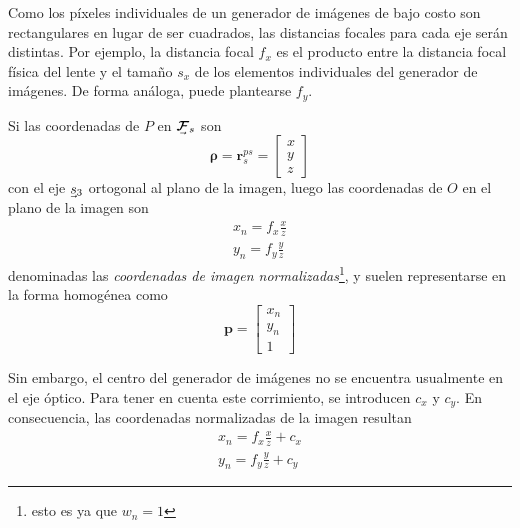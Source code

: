 Como los píxeles individuales de un generador de imágenes de bajo costo son rectangulares en lugar de ser cuadrados, las distancias focales para cada eje serán distintas. Por ejemplo, la distancia focal $f_x$ es el producto entre la distancia focal física del lente y el tamaño $s_x$ de los elementos individuales del generador de imágenes. De forma análoga, puede plantearse $f_y$.

Si las coordenadas de $P$ en $\undervec{\bm{\mathcal{F}}}_s$ son
\begin{equation}
    \bm{\rho} = \bm{r}_s^{ps} = 
    \begin{bmatrix}
        x \\
        y \\
        z
    \end{bmatrix}
\end{equation}
con el eje $\undervec{s}_3$ ortogonal al plano de la imagen, luego las coordenadas de $O$ en el plano de la imagen son
\begin{align}
    x_n = f_x \frac{x}{z} \\
    y_n = f_y \frac{y}{z}
\end{align}
denominadas las \textit{coordenadas de imagen normalizadas}\footnote{esto es ya que $w_n=1$}, y suelen representarse en la forma homogénea como
\begin{equation}
    \bm{p} =
    \begin{bmatrix}
        x_n \\
        y_n \\
        1
        \label{eq:homogeneousnormalizedimagecoordinates}
    \end{bmatrix}
\end{equation}

Sin embargo, el centro del generador de imágenes no se encuentra usualmente en el eje óptico. Para tener en cuenta este corrimiento, se introducen $c_x$ y $c_y$. En consecuencia, las coordenadas normalizadas de la imagen resultan
\begin{align}
    x_n = f_x \frac{x}{z} + c_x
    \label{eq:x_n}
    \\
    y_n = f_y \frac{y}{z} + c_y
    \label{eq:y_n}
\end{align}

